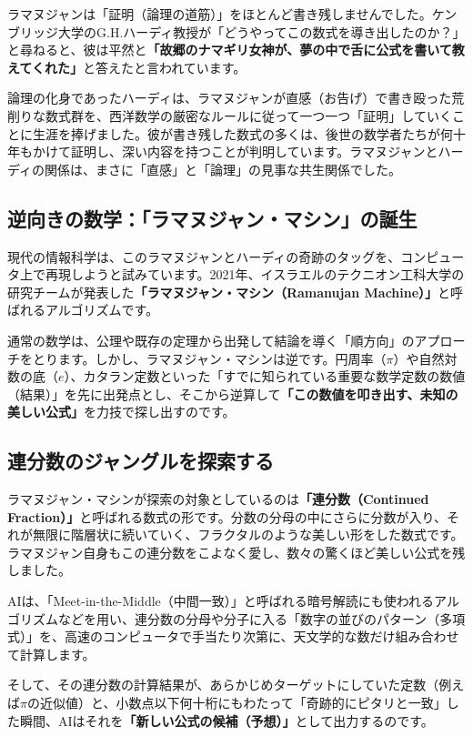 ラマヌジャンは「証明（論理の道筋）」をほとんど書き残しませんでした。ケンブリッジ大学のG.H.ハーディ教授が「どうやってこの数式を導き出したのか？」と尋ねると、彼は平然と\textbf{「故郷のナマギリ女神が、夢の中で舌に公式を書いて教えてくれた」}と答えたと言われています。

論理の化身であったハーディは、ラマヌジャンが直感（お告げ）で書き殴った荒削りな数式群を、西洋数学の厳密なルールに従って一つ一つ「証明」していくことに生涯を捧げました。彼が書き残した数式の多くは、後世の数学者たちが何十年もかけて証明し、深い内容を持つことが判明しています。ラマヌジャンとハーディの関係は、まさに「直感」と「論理」の見事な共生関係でした。

\subsection{逆向きの数学：「ラマヌジャン・マシン」の誕生}

現代の情報科学は、このラマヌジャンとハーディの奇跡のタッグを、コンピュータ上で再現しようと試みています。2021年、イスラエルのテクニオン工科大学の研究チームが発表した\textbf{「ラマヌジャン・マシン（Ramanujan Machine）」}と呼ばれるアルゴリズムです。

通常の数学は、公理や既存の定理から出発して結論を導く「順方向」のアプローチをとります。しかし、ラマヌジャン・マシンは逆です。円周率（\(\pi\)）や自然対数の底（\(e\)）、カタラン定数といった「すでに知られている重要な数学定数の数値（結果）」を先に出発点とし、そこから逆算して\textbf{「この数値を叩き出す、未知の美しい公式」}を力技で探し出すのです。

\subsection{連分数のジャングルを探索する}

ラマヌジャン・マシンが探索の対象としているのは\textbf{「連分数（Continued Fraction）」}と呼ばれる数式の形です。分数の分母の中にさらに分数が入り、それが無限に階層状に続いていく、フラクタルのような美しい形をした数式です。ラマヌジャン自身もこの連分数をこよなく愛し、数々の驚くほど美しい公式を残しました。

AIは、「Meet-in-the-Middle（中間一致）」と呼ばれる暗号解読にも使われるアルゴリズムなどを用い、連分数の分母や分子に入る「数字の並びのパターン（多項式）」を、高速のコンピュータで手当たり次第に、天文学的な数だけ組み合わせて計算します。

そして、その連分数の計算結果が、あらかじめターゲットにしていた定数（例えば\(\pi\)の近似値）と、小数点以下何十桁にもわたって「奇跡的にピタリと一致」した瞬間、AIはそれを\textbf{「新しい公式の候補（予想）」}として出力するのです。

